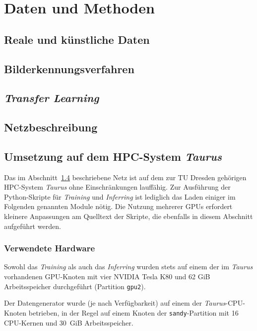\section{Daten und Methoden}
\label{daten}

\subsection{Reale und künstliche Daten}
\label{daten:daten}


\subsection{Bilderkennungsverfahren}
\label{daten:bilderkennung}

\subsection{\textit{Transfer Learning}}
\label{daten:transfer}

\subsection{Netzbeschreibung}
\label{daten:netzbeschreibung}

\subsection{Umsetzung auf dem HPC-System \textit{Taurus}}
\label{daten:taurus}

Das im Abschnitt~\ref{daten:netzbeschreibung} beschriebene Netz ist auf dem zur TU Dresden gehörigen HPC-System
\textit{Taurus} ohne Einschränkungen lauffähig. Zur Ausführung der Python-Skripte für \textit{Training} und
\textit{Inferring} ist lediglich das Laden einiger im Folgenden genannten Module nötig. Die Nutzung mehrerer GPUs
erfordert kleinere Anpassungen am Quelltext der Skripte, die ebenfalls in diesem Abschnitt aufgeführt werden.

\subsubsection{Verwendete Hardware}
\label{daten:taurus:hardware}

Sowohl das \textit{Training} als auch das \textit{Inferring} wurden stets auf einem der im \textit{Taurus} vorhandenen
GPU-Knoten mit vier NVIDIA Tesla K80 und 62 GiB Arbeitsspeicher durchgeführt (Partition \texttt{gpu2}).

Der Datengenerator wurde (je nach Verfügbarkeit) auf einem der \textit{Taurus}-CPU-Knoten betrieben, in der Regel auf
einem Knoten der \texttt{sandy}-Partition mit 16 CPU-Kernen und 30\ GiB Arbeitsspeicher.

